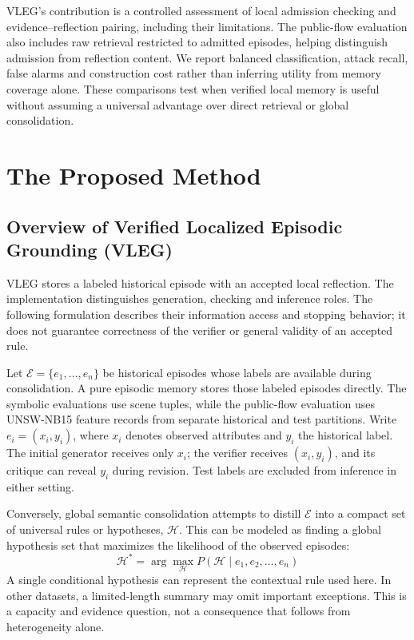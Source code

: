 \documentclass[journal]{IEEEtran}
\theoremstyle{definition}
\theoremstyle{remark}
\begin{document}
VLEG's contribution is a controlled assessment of local admission checking and evidence--reflection pairing, including their limitations. The public-flow evaluation also includes raw retrieval restricted to admitted episodes, helping distinguish admission from reflection content. We report balanced classification, attack recall, false alarms and construction cost rather than inferring utility from memory coverage alone. These comparisons test when verified local memory is useful without assuming a universal advantage over direct retrieval or global consolidation.

\section{The Proposed Method}
\label{sec:vleg-methodology}
\subsection{Overview of Verified Localized Episodic Grounding (VLEG)}
VLEG stores a labeled historical episode with an accepted local reflection. The implementation distinguishes generation, checking and inference roles. The following formulation describes their information access and stopping behavior; it does not guarantee correctness of the verifier or general validity of an accepted rule.

Let $\mathcal{E}=\{e_1,\ldots,e_n\}$ be historical episodes whose labels are available during consolidation. A pure episodic memory stores those labeled episodes directly. The symbolic evaluations use scene tuples, while the public-flow evaluation uses UNSW-NB15 feature records from separate historical and test partitions. Write $e_i=(x_i,y_i)$, where $x_i$ denotes observed attributes and $y_i$ the historical label. The initial generator receives only $x_i$; the verifier receives $(x_i,y_i)$, and its critique can reveal $y_i$ during revision. Test labels are excluded from inference in either setting.

Conversely, global semantic consolidation \cite{agarwal2026hypothesis} attempts to distill $\mathcal{E}$ into a compact set of universal rules or hypotheses, $\mathcal{H}$. This can be modeled as finding a global hypothesis set that maximizes the likelihood of the observed episodes:
\begin{equation}
    \mathcal{H}^* = \arg\max_{\mathcal{H}} P(\mathcal{H} \mid e_1, e_2, \dots, e_n)
\end{equation}
A single conditional hypothesis can represent the contextual rule used here. In other datasets, a limited-length summary may omit important exceptions. This is a capacity and evidence question, not a consequence that follows from heterogeneity alone.
\end{document}
